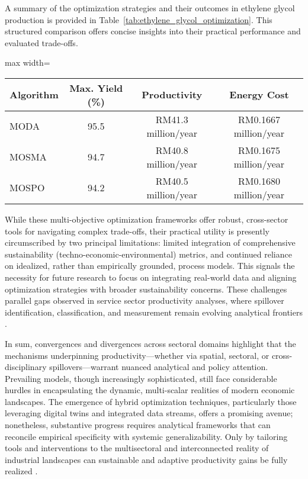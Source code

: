 \documentclass[sigconf]{acmart}
\begin{document}
A summary of the optimization strategies and their outcomes in ethylene glycol production is provided in Table~\ref{tab:ethylene_glycol_optimization}. This structured comparison offers concise insights into their practical performance and evaluated trade-offs.

\begin{table*}[htbp]
\centering
\caption{Comparison of Multi-Objective Optimization Approaches in Ethylene Glycol Production}
\label{tab:ethylene_glycol_optimization}
\begin{adjustbox}{max width=\textwidth}
\begin{tabular}{lccc}
\toprule
\textbf{Algorithm} & \textbf{Max. Yield (\%)} & \textbf{Productivity} & \textbf{Energy Cost} \\
\midrule
MODA  & 95.5 & RM41.3 million/year & RM0.1667 million/year \\
MOSMA & 94.7 & RM40.8 million/year & RM0.1675 million/year \\
MOSPO & 94.2 & RM40.5 million/year & RM0.1680 million/year \\
\bottomrule
\end{tabular}
\end{adjustbox}
\end{table*}

While these multi-objective optimization frameworks offer robust, cross-sector tools for navigating complex trade-offs, their practical utility is presently circumscribed by two principal limitations: limited integration of comprehensive sustainability (techno-economic-environmental) metrics, and continued reliance on idealized, rather than empirically grounded, process models. This signals the necessity for future research to focus on integrating real-world data and aligning optimization strategies with broader sustainability concerns. These challenges parallel gaps observed in service sector productivity analyses, where spillover identification, classification, and measurement remain evolving analytical frontiers \cite{ref75}.

In sum, convergences and divergences across sectoral domains highlight that the mechanisms underpinning productivity—whether via spatial, sectoral, or cross-disciplinary spillovers—warrant nuanced analytical and policy attention. Prevailing models, though increasingly sophisticated, still face considerable hurdles in encapsulating the dynamic, multi-scalar realities of modern economic landscapes. The emergence of hybrid optimization techniques, particularly those leveraging digital twins and integrated data streams, offers a promising avenue; nonetheless, substantive progress requires analytical frameworks that can reconcile empirical specificity with systemic generalizability. Only by tailoring tools and interventions to the multisectoral and interconnected reality of industrial landscapes can sustainable and adaptive productivity gains be fully realized \cite{ref74}\cite{ref75}\cite{ref88}.
\end{document}
